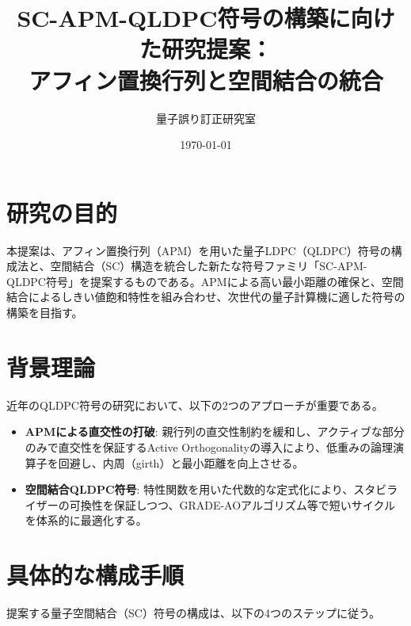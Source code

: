 \documentclass[12pt]{article}
\title{SC-APM-QLDPC符号の構築に向けた研究提案：\\アフィン置換行列と空間結合の統合}
\author{量子誤り訂正研究室}
\date{\today}
\begin{document}
\maketitle

\section{研究の目的}
本提案は、アフィン置換行列（APM）を用いた量子LDPC（QLDPC）符号の構成法と、空間結合（SC）構造を統合した新たな符号ファミリ「SC-APM-QLDPC符号」を提案するものである。APMによる高い最小距離の確保と、空間結合によるしきい値飽和特性を組み合わせ、次世代の量子計算機に適した符号の構築を目指す。

\section{背景理論}
近年のQLDPC符号の研究において、以下の2つのアプローチが重要である。
\begin{itemize}
    \item \textbf{APMによる直交性の打破}: 親行列の直交性制約を緩和し、アクティブな部分のみで直交性を保証するActive Orthogonalityの導入により、低重みの論理演算子を回避し、内周（girth）と最小距離を向上させる。
    \item \textbf{空間結合QLDPC符号}: 特性関数を用いた代数的な定式化により、スタビライザーの可換性を保証しつつ、GRADE-AOアルゴリズム等で短いサイクルを体系的に最適化する。
\end{itemize}

\section*{具体的な構成手順}

提案する量子空間結合（SC）符号の構成は、以下の4つのステップに従う。
\end{document}
